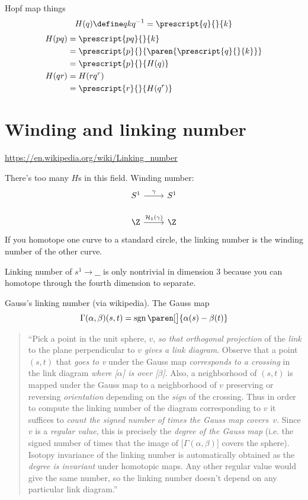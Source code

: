 \documentclass[draft]{scrartcl}
\renewcommand{\blank}{\_\_}
\DeclareMathOperator{\sgn}{sgn}
\newcommand{\upleft}[2]{\prescript{#1}{}{#2}}
\begin{document}
\begin{multicols*}{2}
  Hopf map things
  \[
    H(q)\define qkq^{-1} = \upleft{q}{k}
  \]
  \begin{align*}
    H(pq) &= \upleft{pq}{k} \\
          &= \upleft{p}{\paren{\upleft{ q}k }} \\
          &=\upleft{p}{H(q)} \\
    H(qr) &= H(rq^r) \\
          &= \upleft{r}{H(q^r)}
  \end{align*}

  \section{Winding and linking number}
  \renewcommand{\H}{\mathcal H}
  \url{https://en.wikipedia.org/wiki/Linking_number}

  There's too many \(H\)s in this field.
  Winding number:
  \[
    \begin{tikzcd}
      S^1 \rar{\gamma} & S^1 \\
      \Z \rar{\H_1(\gamma)} & \Z
    \end{tikzcd}
  \]
  If you homotope one curve to a standard circle, the linking number is the winding number of the other curve.

  Linking number of \(s^1\to \blank\) is only nontrivial in dimension 3 because you can homotope through the fourth dimension to separate. %

  Gauss's linking number (via wikipedia). The Gauss map
  \[
    \Gamma(\alpha,\beta)(s,t) = \sgn\paren[\big]{\alpha(s) -\beta(t)}
  \]
  \begin{quote}
    \footnotesize
    ``Pick a point in the unit sphere, \(v\), \emph{so that orthogonal projection} of the \emph{link} to the plane perpendicular to \(v\) \emph{gives a link diagram}. Observe that a point \((s, t)\) that \emph{goes to v} under the Gauss map \emph{corresponds to a crossing} in the link diagram \emph{where [\(\alpha\)] is over [\(\beta\)]}.  Also, a neighborhood of \((s, t)\) is mapped under the Gauss map to a neighborhood of \(v\) preserving or reversing \emph{orientation} depending on the \emph{sign} of the crossing. Thus in order to compute the linking number of the diagram corresponding to \(v\) it suffices to \emph{count the signed number of times the Gauss map covers\eulit{}~\(v\)}. Since \(v\) is a \emph{regular value}, this is precisely the \emph{degree of the Gauss map} (i.e. the signed number of times that the image of [\(Γ(\alpha,\beta)\)] covers the sphere). Isotopy invariance of the linking number is automatically obtained as the \emph{degree is invariant} under homotopic maps. Any other regular value would give the same number, so the linking number doesn't depend on any particular link diagram.''
  \end{quote}


\end{multicols*}
\end{document}
